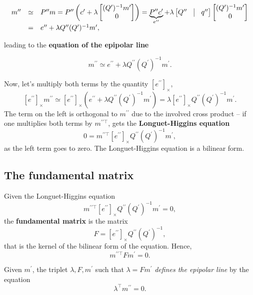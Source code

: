 \documentclass[10pt]{report}
\begin{document}
$$\begin{array}{lll}m^{\prime\prime} & \simeq & P^{\prime\prime}m = P^{\prime\prime} \left(c^\prime + \lambda\begin{bmatrix}(Q^\prime)^{-1} m^\prime \\ 0 \end{bmatrix}\right) = \underbrace{P^{\prime\prime}c^\prime}_{e^{\prime\prime}} + \lambda\begin{bmatrix}Q^{\prime\prime} & \vline & q^{\prime\prime}\end{bmatrix}\begin{bmatrix}(Q^\prime)^{-1} m^\prime \\ 0 \end{bmatrix} \\ & = & e^{\prime\prime} + \lambda Q^{\prime\prime} (Q^\prime)^{-1} m^\prime,\end{array}$$

leading to the \textbf{equation of the epipolar line}

$$m^{\prime\prime} \simeq e^{\prime\prime} + \lambda Q^{\prime\prime} (Q^\prime)^{-1} m^\prime.$$

Now, let's multiply both terms by the quantity \([e^{\prime\prime}]_\times\),
$$[e^{\prime\prime}]_\times m^{\prime\prime} \simeq [e^{\prime\prime}]_\times (e^{\prime\prime} + \lambda Q^{\prime\prime} (Q^\prime)^{-1} m^\prime) = \lambda [e^{\prime\prime}]_\times Q^{\prime\prime}(Q^\prime)^{-1}m^\prime.$$ The term on the left is orthogonal to \(m^{\prime\prime}\) due to the involved cross product -- if one multiplies both terms by \(m^{\prime\prime\top}\), gets the \textbf{Longuet\--Higgins equation} $$0 = m^{\prime\prime\top} [e^{\prime\prime}]_\times Q^{\prime\prime}(Q^\prime)^{-1}m^\prime,$$ as the left term goes to zero. The Longuet\--Higgins equation is a bilinear form.

\subsection{The fundamental matrix}
\label{sec:org0d3d87e}
Given the Longuet\--Higgins equation $$m^{\prime\prime\top} [e^{\prime\prime}]_\times Q^{\prime\prime}(Q^\prime)^{-1}m^\prime = 0,$$ the \textbf{fundamental matrix} is the matrix $$F = [e^{\prime\prime}]_\times Q^{\prime\prime}(Q^\prime)^{-1},$$ that is the kernel of the bilinear form of the equation. Hence, $$m^{\prime\prime\top} F m^\prime = 0.$$

Given \(m^\prime\), the triplet \(\lambda, F, m^\prime\) such that \(\lambda = Fm^\prime\) \emph{defines the epipolar line} by the equation $$\lambda^\top m^{\prime\prime} = 0.$$
\end{document}
